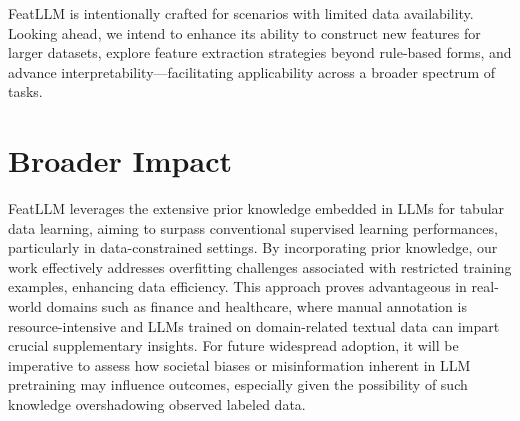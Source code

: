 \textsf{FeatLLM} is intentionally crafted for scenarios with limited data availability. Looking ahead, we intend to enhance its ability to construct new features for larger datasets, explore feature extraction strategies beyond rule-based forms, and advance interpretability—facilitating applicability across a broader spectrum of tasks.

\section{Broader Impact}
\textsf{FeatLLM} leverages the extensive prior knowledge embedded in LLMs for tabular data learning, aiming to surpass conventional supervised learning performances, particularly in data-constrained settings. By incorporating prior knowledge, our work effectively addresses overfitting challenges associated with restricted training examples, enhancing data efficiency. This approach proves advantageous in real-world domains such as finance and healthcare, where manual annotation is resource-intensive and LLMs trained on domain-related textual data can impart crucial supplementary insights. For future widespread adoption, it will be imperative to assess how societal biases or misinformation inherent in LLM pretraining may influence outcomes, especially given the possibility of such knowledge overshadowing observed labeled data.

